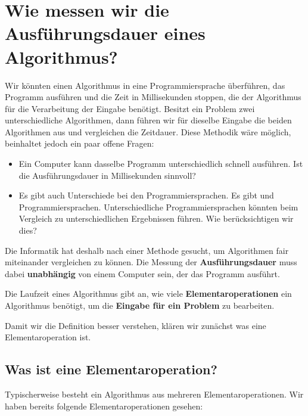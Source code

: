 
\laufzeitSuchalgorithmenLernziele

\section{Wie messen wir die Ausführungsdauer eines Algorithmus?}

Wir könnten einen Algorithmus in eine Programmiersprache überführen, das Programm ausführen und die Zeit in Millisekunden stoppen, die der Algorithmus für die Verarbeitung der Eingabe benötigt. Besitzt ein Problem zwei unterschiedliche Algorithmen, dann führen wir für dieselbe Eingabe die beiden Algorithmen aus und vergleichen die Zeitdauer. Diese Methodik wäre möglich, beinhaltet jedoch ein paar offene Fragen:

\begin{itemize}
	\item Ein Computer kann dasselbe Programm unterschiedlich schnell ausführen. Ist die Ausführungsdauer in Millisekunden sinnvoll?
	\item Es gibt auch Unterschiede bei den Programmiersprachen. Es gibt  und  Programmiersprachen. Unterschiedliche Programmiersprachen könnten beim Vergleich zu unterschiedlichen Ergebnissen führen. Wie berücksichtigen wir dies?
\end{itemize}

Die Informatik hat deshalb nach einer Methode gesucht, um Algorithmen fair miteinander vergleichen zu können. Die Messung der \textbf{Ausführungsdauer} muss dabei \textbf{unabhängig} von einem Computer sein, der das Programm ausführt.

\begin{definition}[Laufzeit]
Die Laufzeit eines Algorithmus gibt an, wie viele \textbf{Elementaroperationen} ein Algorithmus benötigt, um die \textbf{Eingabe für ein Problem} zu bearbeiten.
\end{definition}

Damit wir die Definition besser verstehen, klären wir zunächst was eine Elementaroperation ist.

\subsection{Was ist eine Elementaroperation?}

Typischerweise besteht ein Algorithmus aus mehreren Elementaroperationen. Wir haben bereits folgende Elementaroperationen gesehen:

